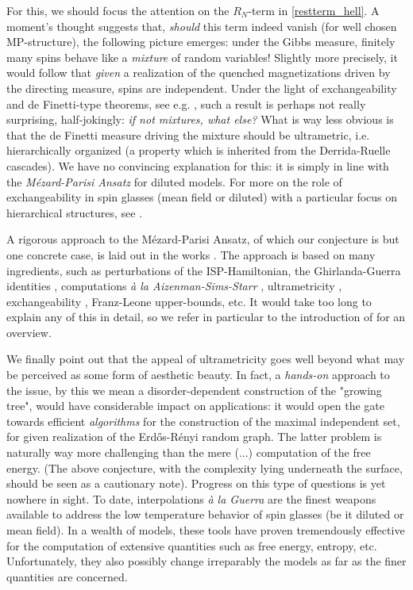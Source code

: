 \documentclass[a4paper,12pt,oneside,reqno]{amsart}
\numberwithin{equation}{section}
\begin{document}
For this, we should focus the attention on the $R_N$-term  in \eqref{restterm_hell}. A moment's thought suggests that,  {\it should} this term indeed vanish (for well chosen MP-structure), the following picture emerges: under the Gibbs measure, finitely many spins behave like a {\it mixture} of random variables! Slightly more precisely, it would follow that {\it given} a realization of the quenched magnetizations driven by the directing measure, spins are independent. Under the light of exchangeability and de Finetti-type theorems, see e.g. \cite{aldous}, such a result is perhaps not really surprising, half-jokingly: 
{\it if not mixtures, what else?} What is way less obvious is that the de Finetti measure driving the mixture should be ultrametric, i.e. hierarchically organized (a property which is inherited from the Derrida-Ruelle cascades). We have no convincing explanation for this: it is simply in line with the {\it  M\'{e}zard-Parisi Ansatz} \cite{giogio_mezard} for diluted models. For more on the role of exchangeability in spin glasses (mean field or diluted) with a particular focus on hierarchical structures, see 
\cite{panchy_four}.  

A rigorous approach to the M\'{e}zard-Parisi Ansatz, of which our conjecture is but one concrete case, is laid out in the works \cite{panchy, panchy_one, panchy_two, panchy_three, panchy_arxiv}. The approach is based on
many ingredients, such as perturbations of the ISP-Hamiltonian, the Ghirlanda-Guerra identities \cite{gg},  computations {\it \`{a} la  Aizenman-Sims-Starr} \cite{ass}, ultrametricity \cite{panchy}, exchangeability \cite{panchy_two}, Franz-Leone \cite{franz} upper-bounds, etc. It would take too long to explain any of this in detail, so we refer in particular to the introduction of \cite{panchy_arxiv} for an overview. 

We finally point out that the appeal of ultrametricity goes well beyond what may be perceived as some form of  aesthetic beauty. In fact, a {\it hands-on} approach to the issue, by this we mean a disorder-dependent construction of the "growing tree",  would have considerable impact on applications:  it would open the gate towards efficient {\it algorithms} for the construction of the maximal independent set, for given realization of the Erd\H{o}s-R\'{e}nyi random graph. The latter problem is naturally way more challenging than the mere (...) computation of the free energy. (The above conjecture, with the complexity lying underneath the surface, should   be seen as a cautionary note). Progress on this type of questions is yet nowhere in sight. 
To date, interpolations {\it \`{a} la Guerra} are the finest weapons available to address the low temperature behavior of spin glasses (be it diluted or mean field). In a wealth of models, these tools have proven tremendously effective for the computation of extensive quantities such as free energy, entropy, etc. Unfortunately, they also possibly change irreparably the models as far as the finer quantities are concerned.  \\
\end{document}
